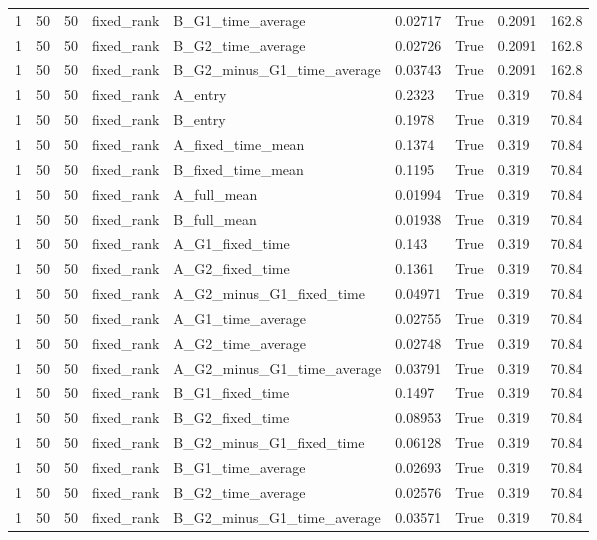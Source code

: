 \begin{longtable}{lllllllll}
1 & 50 & 50 & fixed\_rank & B\_G1\_time\_average & 0.02717 & True & 0.2091 & 162.8 \\
1 & 50 & 50 & fixed\_rank & B\_G2\_time\_average & 0.02726 & True & 0.2091 & 162.8 \\
1 & 50 & 50 & fixed\_rank & B\_G2\_minus\_G1\_time\_average & 0.03743 & True & 0.2091 & 162.8 \\
1 & 50 & 50 & fixed\_rank & A\_entry & 0.2323 & True & 0.319 & 70.84 \\
1 & 50 & 50 & fixed\_rank & B\_entry & 0.1978 & True & 0.319 & 70.84 \\
1 & 50 & 50 & fixed\_rank & A\_fixed\_time\_mean & 0.1374 & True & 0.319 & 70.84 \\
1 & 50 & 50 & fixed\_rank & B\_fixed\_time\_mean & 0.1195 & True & 0.319 & 70.84 \\
1 & 50 & 50 & fixed\_rank & A\_full\_mean & 0.01994 & True & 0.319 & 70.84 \\
1 & 50 & 50 & fixed\_rank & B\_full\_mean & 0.01938 & True & 0.319 & 70.84 \\
1 & 50 & 50 & fixed\_rank & A\_G1\_fixed\_time & 0.143 & True & 0.319 & 70.84 \\
1 & 50 & 50 & fixed\_rank & A\_G2\_fixed\_time & 0.1361 & True & 0.319 & 70.84 \\
1 & 50 & 50 & fixed\_rank & A\_G2\_minus\_G1\_fixed\_time & 0.04971 & True & 0.319 & 70.84 \\
1 & 50 & 50 & fixed\_rank & A\_G1\_time\_average & 0.02755 & True & 0.319 & 70.84 \\
1 & 50 & 50 & fixed\_rank & A\_G2\_time\_average & 0.02748 & True & 0.319 & 70.84 \\
1 & 50 & 50 & fixed\_rank & A\_G2\_minus\_G1\_time\_average & 0.03791 & True & 0.319 & 70.84 \\
1 & 50 & 50 & fixed\_rank & B\_G1\_fixed\_time & 0.1497 & True & 0.319 & 70.84 \\
1 & 50 & 50 & fixed\_rank & B\_G2\_fixed\_time & 0.08953 & True & 0.319 & 70.84 \\
1 & 50 & 50 & fixed\_rank & B\_G2\_minus\_G1\_fixed\_time & 0.06128 & True & 0.319 & 70.84 \\
1 & 50 & 50 & fixed\_rank & B\_G1\_time\_average & 0.02693 & True & 0.319 & 70.84 \\
1 & 50 & 50 & fixed\_rank & B\_G2\_time\_average & 0.02576 & True & 0.319 & 70.84 \\
1 & 50 & 50 & fixed\_rank & B\_G2\_minus\_G1\_time\_average & 0.03571 & True & 0.319 & 70.84 \\

\end{longtable}
